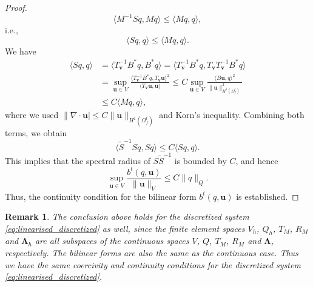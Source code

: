 \documentclass{article}
\newcommand{\bu}{{\mathbf{u}}}
\newcommand{\bv}{{\mathbf{v}}}
\newtheorem{remark}[theorem]{Remark}
\begin{document}
\begin{proof}
\begin{equation}
    \langle M^{-1} S q, M q \rangle \leq \langle M q, q \rangle,
\end{equation}
i.e.,
\begin{equation} 
    \langle S q, q \rangle \leq \langle M q, q \rangle.
\end{equation}
We have
\begin{equation}
    \begin{aligned}
        \langle S q, q \rangle 
        &= \langle T_\bv^{-1} B^* q, B^* q \rangle 
         = \langle T_\bv^{-1} B^* q, T_\bv T_\bv^{-1} B^* q \rangle \\
        &= \sup_{\bu \in V} \frac{\langle T_\bv^{-1} B^* q, T_\bv \bu \rangle^2}{\langle T_\bv \bu, \bu \rangle} 
         \leq C \sup_{\bu \in V} \frac{\langle B \bu, q \rangle^2}{\|\bu\|_{H^1(\Omega_f^t)}^2} \\
        &\leq C \langle M q, q \rangle,
    \end{aligned} 
\end{equation}
where we used $\|\nabla \cdot \bu| \leq C \|\bu\|_{H^1(\Omega_f^t)}$ and Korn's inequality. Combining both terms, we obtain
\begin{equation}
    \langle \tilde{S}^{-1} S q, S q \rangle \leq C \langle S q, q \rangle.
\end{equation}
This implies that the spectral radius of $S \tilde{S}^{-1}$ is bounded by $C$, and hence
\begin{equation}
    \sup_{\bu \in V} \frac{b^t(q, \bu)}{\|\bu\|_V} \leq C \|q\|_Q.
\end{equation}
Thus, the continuity condition for the bilinear form $b^t(q, \bu)$ is established.
\end{proof}
\begin{remark}
    The conclusion above holds for the discretized system \eqref{eq:linearised_discretized} as well, since the finite element spaces $V_h$, $Q_h$, $T_M$, $R_M$ and $\boldsymbol{\Lambda}_h$ are all subspaces of the continuous spaces $V$, $Q$, $T_M$, $R_M$ and $\boldsymbol{\Lambda}$, respectively. The bilinear forms are also the same as the continuous case. Thus we have the same coercivity and continuity conditions for the discretized system \eqref{eq:linearised_discretized}.
\end{remark}
\end{document}
